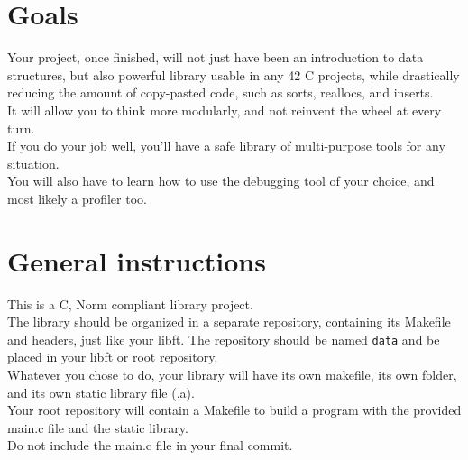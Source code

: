 \documentclass{42-en}
\begin{document}
\chapter{Goals}

    Your project, once finished, will not just have been an introduction to data structures,
    but also powerful library usable in any 42 C projects, while drastically reducing
    the amount of copy-pasted code, such as sorts, reallocs, and inserts.\\

    It will allow you to think more modularly, and not reinvent the wheel at every turn.\\

    If you do your job well, you'll have a safe library of multi-purpose tools for any situation.\\

    You will also have to learn how to use the debugging tool of your choice, and most likely
    a profiler too.

\chapter{General instructions}

    This is a C, Norm compliant library project.\\

    The library should be organized in a separate repository, containing its
    Makefile and headers, just like your libft. The repository should be
    named \texttt{data} and be placed in your libft or root repository.\\

    Whatever you chose to do, your library will have its own makefile,
    its own folder, and its own static library file (.a).\\
    
    Your root repository will contain a Makefile to build a program
    with the provided main.c file and the static library.\\

    Do not include the main.c file in your final commit.\\
\end{document}
